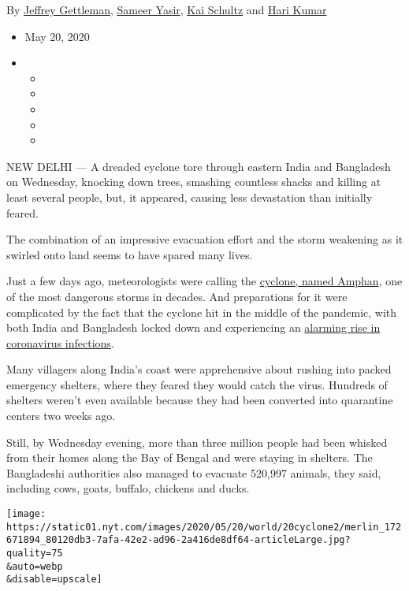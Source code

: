 By \href{https://www.nytimes.com/by/jeffrey-gettleman}{Jeffrey
Gettleman}, \href{https://www.nytimes.com/by/sameer-yasir}{Sameer
Yasir}, \href{https://www.nytimes.com/by/kai-schultz}{Kai Schultz} and
\href{https://www.nytimes.com/by/hari-kumar}{Hari Kumar}

\begin{itemize}
\item
  May 20, 2020
\item
  \begin{itemize}
  \item
  \item
  \item
  \item
  \item
  \end{itemize}
\end{itemize}

NEW DELHI --- A dreaded cyclone tore through eastern India and
Bangladesh on Wednesday, knocking down trees, smashing countless shacks
and killing at least several people, but, it appeared, causing less
devastation than initially feared.

The combination of an impressive evacuation effort and the storm
weakening as it swirled onto land seems to have spared many lives.

Just a few days ago, meteorologists were calling the
\href{https://www.nytimes.com/2020/05/21/world/asia/cyclone-amphan-india-bangladesh.html}{cyclone,
named Amphan}, one of the most dangerous storms in decades. And
preparations for it were complicated by the fact that the cyclone hit in
the middle of the pandemic, with both India and Bangladesh locked down
and experiencing an
\href{https://timesofindia.indiatimes.com/india/covid-19-cases-in-india-cross-1-lakh-mark-over-3000-dead/articleshow/75816534.cms}{alarming
rise in coronavirus infections}.

Many villagers along India's coast were apprehensive about rushing into
packed emergency shelters, where they feared they would catch the virus.
Hundreds of shelters weren't even available because they had been
converted into quarantine centers two weeks ago.

Still, by Wednesday evening, more than three million people had been
whisked from their homes along the Bay of Bengal and were staying in
shelters. The Bangladeshi authorities also managed to evacuate 520,997
animals, they said, including cows, goats, buffalo, chickens and ducks.

\texttt{[image: https://static01.nyt.com/images/2020/05/20/world/20cyclone2/merlin\_172671894\_80120db3-7afa-42e2-ad96-2a416de8df64-articleLarge.jpg?quality=75\\\&auto=webp\\\&disable=upscale]}

